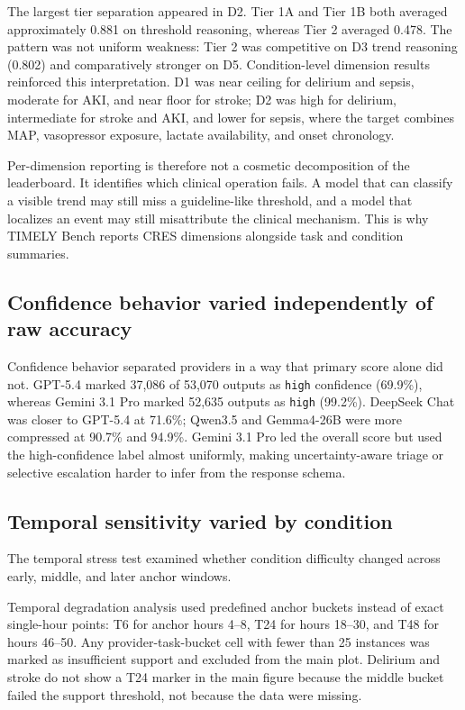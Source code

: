 \documentclass[pdflatex,sn-nature]{sn-jnl}
\begin{document}
The largest tier separation appeared in D2. Tier 1A and Tier 1B both averaged approximately 0.881 on threshold reasoning, whereas Tier 2 averaged 0.478. The pattern was not uniform weakness: Tier 2 was competitive on D3 trend reasoning (0.802) and comparatively stronger on D5. Condition-level dimension results reinforced this interpretation. D1 was near ceiling for delirium and sepsis, moderate for AKI, and near floor for stroke; D2 was high for delirium, intermediate for stroke and AKI, and lower for sepsis, where the target combines MAP, vasopressor exposure, lactate availability, and onset chronology.

Per-dimension reporting is therefore not a cosmetic decomposition of the leaderboard. It identifies which clinical operation fails. A model that can classify a visible trend may still miss a guideline-like threshold, and a model that localizes an event may still misattribute the clinical mechanism. This is why TIMELY Bench reports CRES dimensions alongside task and condition summaries.

\subsection{Confidence behavior varied independently of raw accuracy}

Confidence behavior separated providers in a way that primary score alone did not. GPT-5.4 marked 37,086 of 53,070 outputs as \texttt{high} confidence (69.9\%), whereas Gemini 3.1 Pro marked 52,635 outputs as \texttt{high} (99.2\%). DeepSeek Chat was closer to GPT-5.4 at 71.6\%; Qwen3.5 and Gemma4-26B were more compressed at 90.7\% and 94.9\%. Gemini 3.1 Pro led the overall score but used the high-confidence label almost uniformly, making uncertainty-aware triage or selective escalation harder to infer from the response schema.

\subsection{Temporal sensitivity varied by condition}

The temporal stress test examined whether condition difficulty changed across early, middle, and later anchor windows.

Temporal degradation analysis used predefined anchor buckets instead of exact single-hour points: T6 for anchor hours 4--8, T24 for hours 18--30, and T48 for hours 46--50. Any provider-task-bucket cell with fewer than 25 instances was marked as insufficient support and excluded from the main plot. Delirium and stroke do not show a T24 marker in the main figure because the middle bucket failed the support threshold, not because the data were missing.
\end{document}
